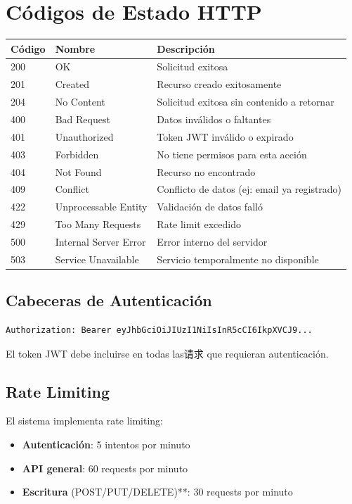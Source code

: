 \documentclass[12pt,a4paper]{article}
\begin{document}
\section{Códigos de Estado HTTP}
\begin{tabular}{|l|l|p{8cm}|}
\hline
\textbf{Código} & \textbf{Nombre} & \textbf{Descripción} \\
\hline
200 & OK & Solicitud exitosa \\
201 & Created & Recurso creado exitosamente \\
204 & No Content & Solicitud exitosa sin contenido a retornar \\
400 & Bad Request & Datos inválidos o faltantes \\
401 & Unauthorized & Token JWT inválido o expirado \\
403 & Forbidden & No tiene permisos para esta acción \\
404 & Not Found & Recurso no encontrado \\
409 & Conflict & Conflicto de datos (ej: email ya registrado) \\
422 & Unprocessable Entity & Validación de datos falló \\
429 & Too Many Requests & Rate limit excedido \\
500 & Internal Server Error & Error interno del servidor \\
503 & Service Unavailable & Servicio temporalmente no disponible \\
\end{tabular}

\subsection{Cabeceras de Autenticación}
\begin{lstlisting}[language=bash]
Authorization: Bearer eyJhbGciOiJIUzI1NiIsInR5cCI6IkpXVCJ9...
\end{lstlisting}

El token JWT debe incluirse en todas las请求 que requieran autenticación.

\subsection{Rate Limiting}
El sistema implementa rate limiting:
\begin{itemize}
    \item \textbf{Autenticación}: 5 intentos por minuto
    \item \textbf{API general}: 60 requests por minuto
    \item \textbf{Escritura} (POST/PUT/DELETE)**: 30 requests por minuto
\end{itemize}
\end{document}
